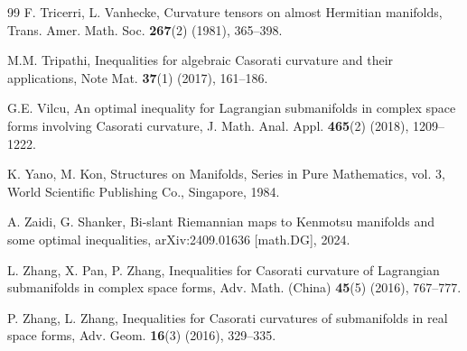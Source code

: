\documentclass[11pt]{amsart}
\theoremstyle{plain}
\theoremstyle{definition}
\theoremstyle{remark}
\begin{document}
\begin{thebibliography}{99}
F. Tricerri, L. Vanhecke, Curvature tensors on almost Hermitian manifolds,
Trans. Amer. Math. Soc. \textbf{267}(2) (1981), 365--398.

M.M. Tripathi, Inequalities for algebraic Casorati curvature and their
applications, Note Mat. \textbf{37}(1) (2017), 161--186.

G.E. Vilcu, An optimal inequality for Lagrangian submanifolds in complex space
forms involving Casorati curvature,
J. Math. Anal. Appl. \textbf{465}(2) (2018), 1209--1222.

K. Yano, M. Kon, Structures on Manifolds, Series in Pure Mathematics, vol. 3,
World Scientific Publishing Co., Singapore, 1984.

A. Zaidi, G. Shanker, Bi-slant Riemannian maps to Kenmotsu manifolds and some
optimal inequalities, arXiv:2409.01636 [math.DG], 2024.

L. Zhang, X. Pan, P. Zhang, Inequalities for Casorati curvature of Lagrangian
submanifolds in complex space forms,
Adv. Math. (China) \textbf{45}(5) (2016), 767--777.

P. Zhang, L. Zhang, Inequalities for Casorati curvatures of submanifolds in
real space forms, Adv. Geom. \textbf{16}(3) (2016), 329--335.

\end{thebibliography}
\end{document}
